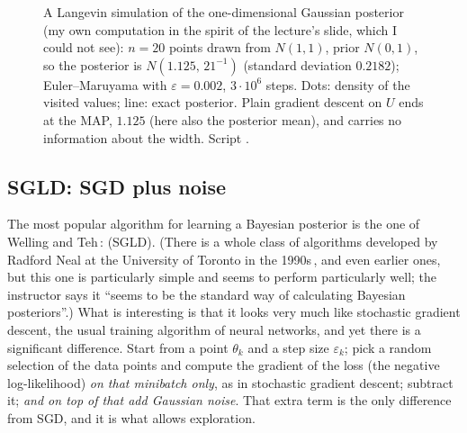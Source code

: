 \begin{figure}[tb]
\centering
{}
\caption{A Langevin simulation of the one-dimensional Gaussian posterior (my own computation in the spirit of the lecture's slide, which I could not see): $n=20$ points drawn from $N(1,1)$, prior $N(0,1)$, so the posterior is $N(1.125,\,21^{-1})$ (standard deviation $0.2182$); Euler--Maruyama with $\varepsilon=0.002$, $3\cdot10^6$ steps. Dots: density of the visited values; line: exact posterior. Plain gradient descent on $U$ ends at the MAP, $1.125$ (here also the posterior mean), and carries no information about the width. Script .}
\label{fig:L5-langevin}
\end{figure}

\subsection{SGLD: SGD plus noise}\label{sec:L5-sgld}
The most popular algorithm for learning a Bayesian posterior is the one of Welling and Teh\,\citep{welling2011}:  (SGLD). (There is a whole class of algorithms developed by Radford Neal at the University of Toronto in the 1990s\,\citep{neal1996}, and even earlier ones, but this one is particularly simple and seems to perform particularly well; the instructor says it ``seems to be the standard way of calculating Bayesian posteriors''.) What is interesting is that it looks very much like stochastic gradient descent, the usual training algorithm of neural networks, and yet there is a significant difference. Start from a point $\theta_k$ and a step size $\varepsilon_k$; pick a random selection of the data points and compute the gradient of the loss (the negative log-likelihood) \emph{on that minibatch only}, as in stochastic gradient descent; subtract it; \emph{and on top of that add Gaussian noise}. That extra term is the only difference from SGD, and it is what allows exploration.

